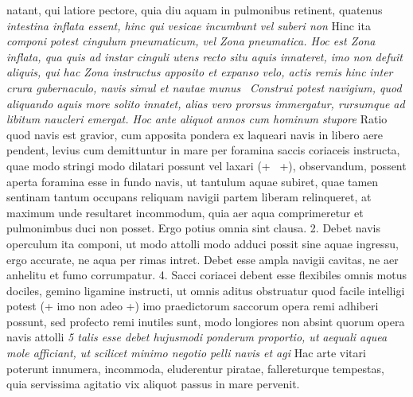 natant, qui latiore pectore, quia diu aquam in pulmonibus retinent, quatenus \textit{intestina inflata essent, hinc qui vesicae incumbunt vel suberi non } Hinc ita \textit{componi potest cingulum pneumaticum\protect{}, vel Zona pneumatica\protect{}. Hoc est Zona inflata, qua quis ad instar cinguli utens recto situ aquis innateret, imo non defuit aliquis, qui hac Zona instructus apposito et expanso velo\protect{}, actis remis hinc}
 \textit{inter crura gubernaculo\protect{}, navis simul et nautae munus }
\pend
\pstart {} \,
\textit{Construi potest navigium, quod aliquando aquis more solito innatet, alias vero prorsus immergatur, rursumque ad libitum naucleri emergat. Hoc ante aliquot annos cum hominum stupore } Ratio quod navis est gravior\protect{}, cum apposita pondera ex laqueari navis in libero aere pendent, levius cum demittuntur in mare per foramina saccis coriaceis instructa, quae modo stringi modo dilatari possunt vel laxari (+ \Denarius\ +), observandum, possent aperta foramina esse in fundo navis, ut tantulum aquae subiret, quae tamen sentinam tantum occupans reliquam navigii partem liberam relinqueret, at maximum unde resultaret incommodum, quia aer aqua comprimeretur et pulmonimbus duci non posset. Ergo potius omnia sint clausa. 2. Debet navis operculum ita componi, ut modo attolli modo adduci possit sine aquae ingressu, ergo accurate, ne aqua per rimas intret. Debet esse ampla navigii cavitas, ne aer anhelitu et fumo corrumpatur. 4. Sacci coriacei\protect{} debent esse flexibiles omnis motus dociles, gemino ligamine instructi, ut omnis aditus obstruatur quod facile intelligi potest (+ imo non adeo +) imo praedictorum saccorum opera remi adhiberi possunt, sed profecto remi inutiles sunt, modo longiores  non absint quorum opera navis attolli 
\textit{5 talis esse debet hujusmodi ponderum proportio\protect{}, ut}  \textit{ aequali aquea mole afficiant, ut scilicet minimo negotio pelli navis et agi } Hac arte vitari poterunt innumera, incommoda, eluderentur piratae, fallereturque tempestas, quia servissima agitatio vix aliquot passus in mare pervenit.

